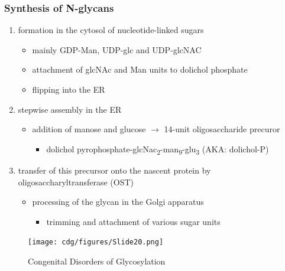 \documentclass[12pt]{scrartcl}
\begin{document}
\subsubsection{Synthesis of N-glycans}
\label{sec:org7976ffc}
\begin{enumerate}
\item formation in the cytosol of nucleotide-linked sugars
\begin{itemize}
\item mainly GDP-Man, UDP-glc and UDP-glcNAC
\item attachment of glcNAc and Man units to dolichol phosphate
\item flipping into the ER
\end{itemize}
\item stepwise assembly in the ER
\begin{itemize}
\item addition of manose and glucose \(\to\) 14-unit oligosaccharide precuror
\begin{itemize}
\item dolichol pyrophosphate-glcNac\textsubscript{2}-man\textsubscript{9}-glu\textsubscript{3} (AKA: dolichol-P)
\end{itemize}
\end{itemize}
\item transfer of this precursor onto the nascent protein by
oligosaccharyltransferase (OST)
\begin{itemize}
\item processing of the glycan in the Golgi apparatus
\begin{itemize}
\item trimming and attachment of various sugar units
\end{itemize}
\end{itemize}
\end{enumerate}

\begin{figure}[htbp]
\centering
\texttt{[image: cdg/figures/Slide20.png]}
\caption{\label{fig:orgd137bb6}Congenital Disorders of Glycosylation}
\end{figure}
\end{document}
